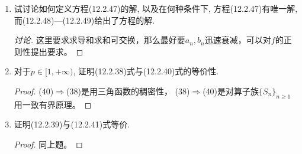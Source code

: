 \begin{quizb}
\begin{enumerate}
\begin{proof}
\textbf{法II.} 利用级数的收敛性，可使得证明简洁一些。
当 $0<|x| \leqslant \pi$ 时，注意到以下所涉及级数的收敛性，对于 $n \geqslant 2$，我们有
\begin{align*}
& \sum_{k=n}^{\infty} b_k \sin k x=\sum_{k=n}^{\infty} b_k \frac{\cos \left(k-\frac{1}{2}\right) x-\cos \left(k+\frac{1}{2}\right) x}{2 \sin \frac{x}{2}} \\
& = b_n \frac{\cos \left(n-\frac{1}{2}\right) x}{2 \sin \frac{x}{2}}-\sum_{k=n}^{\infty}\left(b_k-b_{k+1}\right) \frac{\cos \left(k+\frac{1}{2}\right) x}{2 \sin \frac{x}{2}} \\
& = b_n \frac{\cos \left(n-\frac{1}{2}\right) x-1}{2 \sin \frac{x}{2}}-\sum_{k=n}^{\infty}\left(b_k-b_{k+1}\right) \frac{\cos \left(k+\frac{1}{2}\right) x-1}{2 \sin \frac{x}{2}} \\
& = -b_n \frac{\sin^2 \frac{(2n-1) x}{4}}{\sin \frac{x}{2}}+\sum_{k=n}^{\infty}\left(b_k-b_{k+1}\right) \frac{\sin^2 \frac{(2k+1) x}{4}}{\sin \frac{x}{2}}.
\end{align*}
若 $\frac{1}{n} \leqslant |x| \leqslant \pi$，则由上式得到
\[\left|\sum_{k=n}^{\infty} b_k \sin k x\right| 
\leqslant \frac{b_n}{\sin \frac{|x|}{2}} \leqslant \pi n b_n.\]
若 $0<|x|<\frac{1}{n}$，令 $m=\big[\frac{1}{|x|}\big]$，
则 $\frac{1}{m+1} \leqslant |x|<\frac{1}{m}$。
\begin{align*}
& \left|\sum_{k=n}^{\infty} b_k \sin kx\right| 
\leqslant \left|\sum_{k=n}^m b_k \sin kx\right|
+\left|\sum_{k=m+1}^{\infty} b_k \sin kx\right| \\
& \leqslant \frac{1}{m} \sum_{k=n}^m k b_k+\pi(m+1) b_{m+1} 
\leqslant 2 \pi \sup_{k \geqslant n} k b_k.
\end{align*}
总之，可得
\[\sup_{|x| \leqslant \pi}\left|\sum_{k=n}^{\infty} b_k \sin k x\right| 
\leqslant 2 \pi \sup _{k \geqslant n} k b_k.\]
因此，\(\sum_{n=1}^{\infty} b_n \sin nx\) 在 $[-\pi, \pi]$ 上一致收敛。
\end{proof}
\item 试讨论如何定义方程(12.2.47)的解, 以及在何种条件下, 
方程(12.2.47)有唯一解, 而(12.2.48)---(12.2.49)给出了方程的解.
\begin{proof}[讨论]
    这里要求求导和求和可交换，那么最好要$a_n,b_n$迅速衰减，可以对$f$的正则性提出要求。
\end{proof}
\item 对于\(p\in[1,+\infty)\), 证明(12.2.38)式与(12.2.40)式的等价性.
\begin{proof}
    (40)$\Rightarrow$(38)是用三角函数的稠密性，
    (38)$\Rightarrow$(40)是对算子族$\{S_n\}_{n\geqslant1}$用一致有界原理。
\end{proof}
\item 证明(12.2.39)与(12.2.41)式等价.
\begin{proof}
    同上题。
\end{proof}
\end{enumerate}
\end{quizb}

